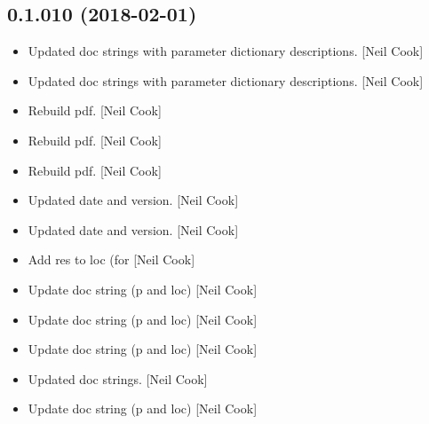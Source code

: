 \documentclass[a4paper,10pt,english]{report}
\begin{document}
\subsection{0.1.010 (2018-02-01)}
\label{\detokenize{misc/changelog:id494}}\begin{itemize}
\item {} 
Updated doc strings with parameter dictionary descriptions. {[}Neil
Cook{]}

\item {} 
Updated doc strings with parameter dictionary descriptions. {[}Neil
Cook{]}

\item {} 
Rebuild pdf. {[}Neil Cook{]}

\item {} 
Rebuild pdf. {[}Neil Cook{]}

\item {} 
Rebuild pdf. {[}Neil Cook{]}

\item {} 
Updated date and version. {[}Neil Cook{]}

\item {} 
Updated date and version. {[}Neil Cook{]}

\item {} 
Add res to loc (for  {[}Neil Cook{]}

\item {} 
Update doc string (p and loc) {[}Neil Cook{]}

\item {} 
Update doc string (p and loc) {[}Neil Cook{]}

\item {} 
Update doc string (p and loc) {[}Neil Cook{]}

\item {} 
Updated doc strings. {[}Neil Cook{]}

\item {} 
Update doc string (p and loc) {[}Neil Cook{]}

\end{itemize}
\end{document}
